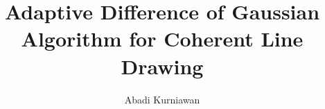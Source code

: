 \begin{frontmatter}
\title{Adaptive Difference of Gaussian Algorithm for Coherent Line Drawing}

\author{Abadi Kurniawan}








\begin{abstract}

\end{abstract}



%
\end{frontmatter}
